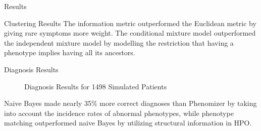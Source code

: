 \documentclass[final]{beamer} %
\begin{document}
\begin{frame}{}
\begin{columns}[T]
\begin{column}{0.3\linewidth}
\begin{block}{\Huge Results}
\begin{block}{\Large Clustering Results }
       The information metric outperformed the Euclidean metric by
       giving rare symptoms more weight. The conditional mixture model
       outperformed the independent mixture model by modelling the
       restriction that having a phenotype implies having all its
       ancestors.
     \end{block}

     \begin{block}{\Large Diagnosis Results}
       \begin{figure}
         \centering
         \caption{Diagnosis Results for 1498 Simulated Patients}
       \end{figure}
       \large Naive Bayes made nearly 35\% more correct diagnoses than
       Phenomizer by taking into account the incidence rates of
       abnormal phenotypes, while phenotype matching outperformed
       naive Bayes by utilizing structural information in HPO.

     \end{block}
   \end{block}
 \end{column}
\end{columns}
\end{frame}
\end{document}
